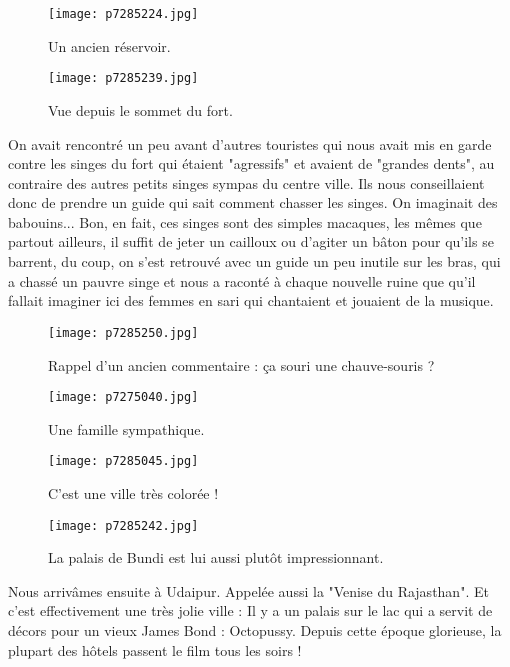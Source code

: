\documentclass{book}
\begin{document}
\begin{figure}[h]
\centering
\texttt{[image: p7285224.jpg]}
\caption*{Un ancien réservoir.}
\end{figure}


\begin{figure}[h]
\centering
\texttt{[image: p7285239.jpg]}
\caption*{Vue depuis le sommet du fort.}
\end{figure}

On avait rencontré un peu avant d'autres touristes qui nous avait mis en garde contre les singes du fort qui étaient "agressifs" et avaient de "grandes dents", au contraire des autres petits singes sympas du centre ville. Ils nous conseillaient donc de prendre un guide qui sait comment chasser les singes. On imaginait des babouins... Bon, en fait, ces singes sont des simples macaques, les mêmes que partout ailleurs, il suffit de jeter un cailloux ou d'agiter un bâton pour qu'ils se barrent, du coup, on s'est retrouvé avec un guide un peu inutile sur les bras, qui a chassé un pauvre singe et nous a raconté à chaque nouvelle ruine que qu'il fallait imaginer ici des femmes en sari qui chantaient et jouaient de la musique.




\begin{figure}[h]
\centering
\texttt{[image: p7285250.jpg]}
\caption*{Rappel d'un ancien commentaire : ça souri une chauve-souris ?}
\end{figure}


\begin{figure}[h]
\centering
\texttt{[image: p7275040.jpg]}
\caption*{Une famille sympathique.}
\end{figure}


\begin{figure}[h]
\centering
\texttt{[image: p7285045.jpg]}
\caption*{C'est une ville très colorée !}
\end{figure}


\begin{figure}[h]
\centering
\texttt{[image: p7285242.jpg]}
\caption*{La palais de Bundi est lui aussi plutôt impressionnant.}
\end{figure}

Nous arrivâmes ensuite à Udaipur. Appelée aussi la "Venise du Rajasthan". Et c'est effectivement une très jolie ville : Il y a un palais sur le lac qui a servit de décors pour un vieux James Bond : Octopussy. Depuis cette époque glorieuse, la plupart des hôtels passent le film tous les soirs !
\end{document}
